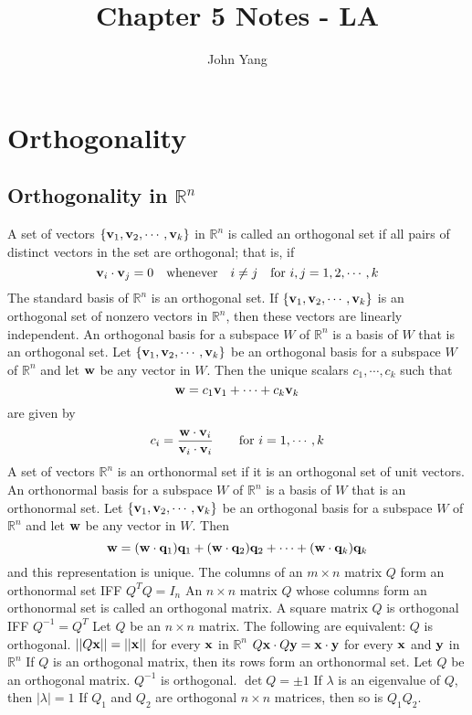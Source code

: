 \documentclass{article}
\title{Chapter 5 Notes - LA} %
\author{John Yang}
\begin{document}
    \maketitle
    \tableofcontents
    \section{Orthogonality} %
    \subsection{Orthogonality in \(\mathbb R^n\)} %
    \begin{outline}
        \1 A set of vectors \(\{\vb v_1,\vb v_2,\cdots,\vb v_k\}\) in \(\mathbb R^n\) is called an orthogonal set if all pairs of distinct vectors in the set are orthogonal; that is, if \[\vb v_i\cdot\vb v_j=0\quad\text{whenever}\quad i\neq j\quad\text{for }i,j=1,2,\cdots,k\]
        \1 The standard basis of \(\mathbb R^n\) is an orthogonal set. 
        \1 If \(\{\vb v_1,\vb v_2,\cdots,\vb v_k\}\) is an orthogonal set of nonzero vectors in \(\mathbb R^n\), then these vectors are linearly independent. 
        \1 An orthogonal basis for a subspace $W$ of \(\mathbb R^n\) is a basis of $W$ that is an orthogonal set. 
        \1 Let \(\{\vb v_1,\vb v_2,\cdots,\vb v_k\}\) be an orthogonal basis for a subspace $W$ of \(\mathbb R^n\) and let \(\vb w\) be any vector in $W$. Then the unique scalars \(c_1,\cdots,c_k\) such that \[\vb w=c_1\vb v_1+\cdots+c_k\vb v_k\] are given by \[c_i=\dfrac{\vb w\cdot\vb v_i}{\vb v_i\cdot \vb v_i}\qquad\text{for }i=1,\cdots,k\] 
        \1 A set of vectors \(\mathbb R^n\) is an orthonormal set if it is an orthogonal set of unit vectors. An orthonormal basis for a subspace $W$ of \(\mathbb R^n\) is a basis of $W$ that is an orthonormal set. 
        \1 Let \(\{\vb v_1,\vb v_2,\cdots,\vb v_k\}\) be an orthogonal basis for a subspace $W$ of \(\mathbb R^n\) and let \(\vb w\) be any vector in $W$. Then \[\vb w=(\vb w\cdot \vb q_1)\vb q_1+(\vb w\cdot\vb q_2)\vb q_2+\cdots+(\vb w\cdot\vb q_k)\vb q_k\] and this representation is unique. 
        \1 The columns of an \(m\times n\) matrix $Q$ form an orthonormal set IFF \(Q^TQ=I_n\)
        \1 An \(n\times n\) matrix $Q$ whose columns form an orthonormal set is called an orthogonal matrix. 
        \1 A square matrix \(Q\) is orthogonal IFF \(Q^{-1}=Q^T\)
        \1 Let $Q$ be an \(n\times n\) matrix. The following are equivalent:
            \2 $Q$ is orthogonal. 
            \2 \(||Q\vb x||=||\vb x||\) for every \(\vb x\) in \(\mathbb R^n\)
            \2 \(Q\vb x\cdot Q\vb y=\vb x\cdot\vb y\) for every \(\vb x\) and \(\vb y\) in \(\mathbb R^n\)
        \1 If $Q$ is an orthogonal matrix, then its rows form an orthonormal set. 
        \1 Let $Q$ be an orthogonal matrix. 
            \2 \(Q^{-1}\) is orthogonal. 
            \2 \(\det Q=\pm 1\)
            \2 If \(\lambda\) is an eigenvalue of $Q$, then \(|\lambda|=1\) 
            \2 If \(Q_1\) and \(Q_2\) are orthogonal \(n\times n\) matrices, then so is \(Q_1Q_2\). 

    \end{outline}
\end{document}

